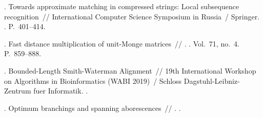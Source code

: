 \begin{thebibliography}{10}
. Towards approximate matching in compressed strings:
  Local subsequence recognition~// International Computer Science Symposium in
  Russia~/ Springer. \BibDash
{}. \BibDash
\newblock P.~401--414.

. Fast distance multiplication of unit-Monge
  matrices~// . \BibDash
{}. \BibDash
\newblock Vol.~71, no.~4. \BibDash
\newblock P.~859--888.

. Bounded-Length Smith-Waterman Alignment~// 19th
  International Workshop on Algorithms in Bioinformatics (WABI 2019)~/ Schloss
  Dagstuhl-Leibniz-Zentrum fuer Informatik. \BibDash
{}.

. Optimum branchings and spanning aborescences~//
  . \BibDash
{}.

\end{thebibliography}
